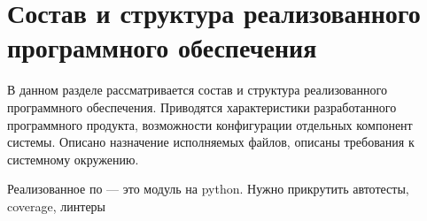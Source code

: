 


\section{Состав и структура реализованного программного обеспечения}
\begin{annotation}
	В данном разделе рассматривается состав и структура реализованного программного обеспечения.
	Приводятся характеристики разработанного программного продукта, возможности конфигурации отдельных
	компонент системы. Описано назначение исполняемых файлов, описаны требования к системному окружению.
\end{annotation}

Реализованное по --- это модуль на python.
Нужно прикрутить автотесты, coverage, линтеры








